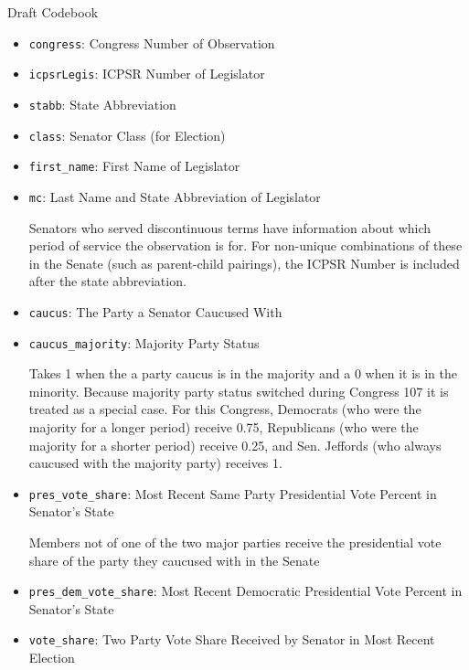 \documentclass[12pt]{article}
\begin{document}
\begin{center}
\Large Draft Codebook
\end{center}

\begin{itemize}
	\item \verb|congress|: Congress Number of Observation
	
	\item \verb|icpsrLegis|: ICPSR Number of Legislator
	
	\item \verb|stabb|: State Abbreviation
	
	\item \verb|class|: Senator Class (for Election)
	
	\item \verb|first_name|: First Name of Legislator
	
	\item \verb|mc|: Last Name and State Abbreviation of Legislator 
	
	Senators who served discontinuous terms have information about which period of service the observation is for. For non-unique combinations of these in the Senate (such as parent-child pairings), the ICPSR Number is included after the state abbreviation.
	
	\item \verb|caucus|: The Party a Senator Caucused With
	
	\item \verb|caucus_majority|: Majority Party Status
	
	Takes 1 when the a party caucus is in the majority and a 0 when it is in the minority. Because majority party status switched during Congress 107 it is treated as a special case. For this Congress, Democrats (who were the majority for a longer period) receive 0.75, Republicans (who were the majority for a shorter period) receive 0.25, and Sen. Jeffords (who always caucused with the majority party) receives 1.
	
	\item \verb|pres_vote_share|: Most Recent Same Party Presidential Vote Percent in Senator's State
	
	Members not of one of the two major parties receive the presidential vote share of the party they caucused with in the Senate
	
	\item \verb|pres_dem_vote_share|: Most Recent Democratic Presidential Vote Percent in Senator's State
	
	\item \verb|vote_share|: Two Party Vote Share Received by Senator in Most Recent Election
	

\end{itemize}
\end{document}
